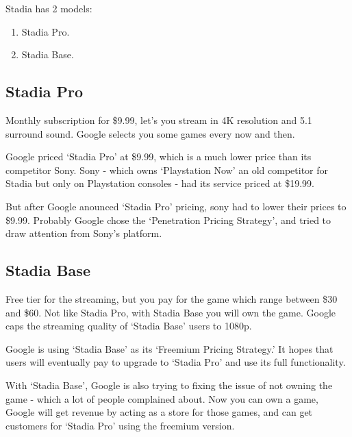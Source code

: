 Stadia has 2 models:
\begin{enumerate}
    \item Stadia Pro.
    \item Stadia Base.
\end{enumerate}

\subsection{Stadia Pro}
Monthly subscription for \$9.99, let's you stream in 4K resolution and 5.1 surround sound.
Google selects you some games every now and then. \cite{stadiaPro}

Google priced `Stadia Pro' at \$9.99, which is a much lower price than its competitor Sony.
Sony - which owns `Playstation Now' an old competitor for Stadia but only on Playstation consoles - had its service priced at \$19.99. \cite{sonyPrices}

But after Google anounced `Stadia Pro' pricing, sony had to lower their prices to \$9.99.
Probably Google chose the `Penetration Pricing Strategy', and tried to draw attention from Sony's platform. \cite{pricingStategy}

\subsection{Stadia Base}
Free tier for the streaming, but you pay for the game which range between \$30 and \$60.
Not like Stadia Pro, with Stadia Base you will own the game.
Google caps the streaming quality of `Stadia Base' users to 1080p. \cite{stadiaBase}

Google is using `Stadia Base' as its `Freemium Pricing Strategy.'
It hopes that users will eventually pay to upgrade to `Stadia Pro' and use its full functionality.

With `Stadia Base', Google is also trying to fixing the issue of not owning the game - which a lot of people complained about.
Now you can own a game, Google will get revenue by acting as a store for those games, and can get customers for `Stadia Pro' using the freemium version.